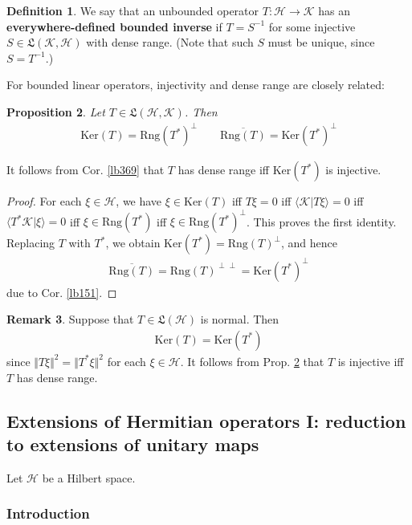 \documentclass[12pt,b5paper,notitlepage]{article}
\theoremstyle{definition}
\newtheorem{df}{Definition}[subsection]
\newtheorem{rem}[df]{Remark}
\theoremstyle{plain}
\newtheorem{pp}[df]{Proposition}
\newcommand{\fk}{\mathfrak}
\newcommand{\ovl}{\overline}
\newcommand{\bk}[1]{\langle {#1}\rangle}
\newcommand{\Ker}{\mathrm{Ker}}
\newcommand{\Rng}{\mathrm{Rng}}
\newcommand{\MH}{\mathcal H}
\newcommand{\MK}{\mathcal K}
\numberwithin{equation}{section}
\begin{document}
\begin{df}\label{lb452}
We say that an unbounded operator $T:\MH\rightarrow\MK$ has an \textbf{everywhere-defined bounded inverse}  if $T=S^{-1}$ for some injective $S\in\fk L(\MK,\MH)$ with dense range. (Note that such $S$ must be unique, since $S=T^{-1}$.)
\end{df}

For bounded linear operators, injectivity and dense range are closely related:



\begin{pp}\label{lb370}
Let $T\in\fk L(\MH,\MK)$. Then
\begin{align*}
\Ker(T)=\Rng(T^*)^\perp\qquad \ovl{\Rng(T)}=\Ker(T^*)^\perp
\end{align*}
\end{pp}

It follows from Cor. \ref{lb369} that $T$ has dense range iff $\Ker(T^*)$ is injective.


\begin{proof}
For each $\xi\in\MH$, we have $\xi\in\Ker(T)$ iff $T\xi=0$ iff $\bk{\MK|T\xi}=0$ iff $\bk{T^*\MK|\xi}=0$ iff $\xi\in\Rng(T^*)$ iff $\xi\in\Rng(T^*)^\perp$. This proves the first identity. Replacing $T$ with $T^*$, we obtain $\Ker(T^*)=\Rng(T)^\perp$, and hence
\begin{align*}
\ovl{\Rng(T)}=\Rng(T)^{\perp\perp}=\Ker(T^*)^\perp
\end{align*}
due to Cor. \ref{lb151}.
\end{proof}


\begin{rem}\label{lb381}
Suppose that $T\in\fk L(\MH)$ is normal. Then 
\begin{align*}
\Ker(T)=\Ker(T^*)
\end{align*}
since $\Vert T\xi\Vert^2=\Vert T^*\xi\Vert^2$ for each $\xi\in\MH$. It follows from Prop. \ref{lb370} that $T$ is injective iff $T$ has dense range.
\end{rem}




\subsection{Extensions of Hermitian operators I: reduction to extensions of unitary maps}\label{lb382}

Let $\MH$ be a Hilbert space.


\subsubsection{Introduction}\label{lb395}
\end{document}
